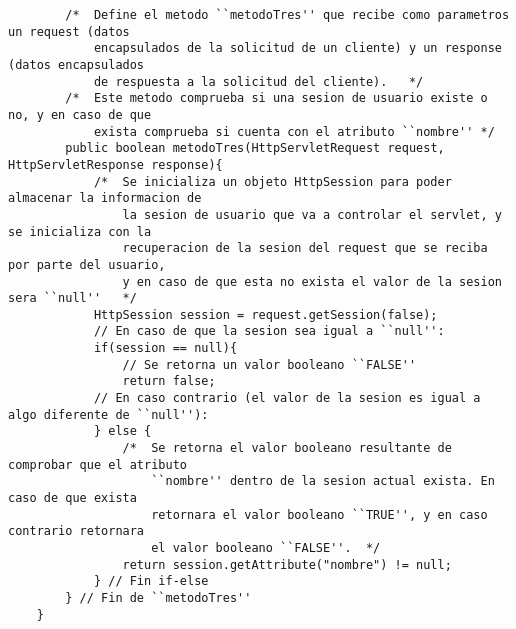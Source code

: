 \documentclass[10pt,a4paper]{article} %
\begin{document}
\begin{lstlisting}
	    /*  Define el metodo ``metodoTres'' que recibe como parametros un request (datos
    	    encapsulados de la solicitud de un cliente) y un response (datos encapsulados
	        de respuesta a la solicitud del cliente).   */
	    /*  Este metodo comprueba si una sesion de usuario existe o no, y en caso de que 
	        exista comprueba si cuenta con el atributo ``nombre'' */
	    public boolean metodoTres(HttpServletRequest request, HttpServletResponse response){
	        /*  Se inicializa un objeto HttpSession para poder almacenar la informacion de 
	            la sesion de usuario que va a controlar el servlet, y se inicializa con la 
	            recuperacion de la sesion del request que se reciba por parte del usuario,
	            y en caso de que esta no exista el valor de la sesion sera ``null''   */
	        HttpSession session = request.getSession(false);
	        // En caso de que la sesion sea igual a ``null'':
	        if(session == null){
	            // Se retorna un valor booleano ``FALSE''
	            return false;
	        // En caso contrario (el valor de la sesion es igual a algo diferente de ``null''):
	        } else {
                /*  Se retorna el valor booleano resultante de comprobar que el atributo 
                    ``nombre'' dentro de la sesion actual exista. En caso de que exista 
                    retornara el valor booleano ``TRUE'', y en caso contrario retornara 
                    el valor booleano ``FALSE''.  */
	            return session.getAttribute("nombre") != null;
	        } // Fin if-else
	    } // Fin de ``metodoTres''
	}
\end{lstlisting} 

\pagebreak

\end{document}
